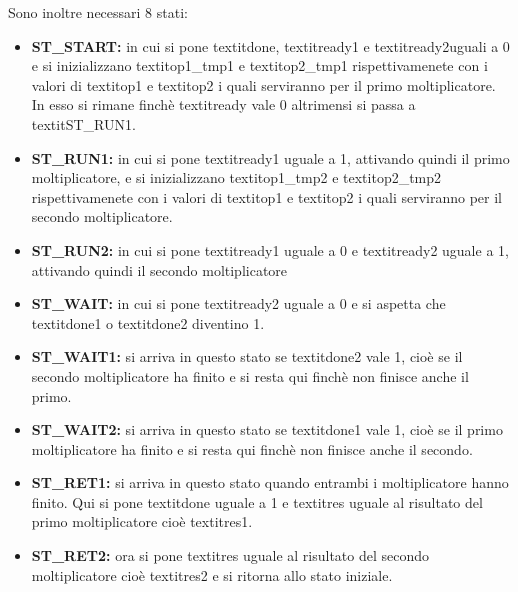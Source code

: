 \documentclass[]{IEEEtran}
\begin{document}
Sono inoltre necessari 8 stati:

\begin{itemize}
    \item \textbf{ST\_START:} in cui si pone textit{done}, textit{ready1} e textit{ready2}uguali a 0 e si inizializzano textit{op1\_tmp1} e textit{op2\_tmp1} rispettivamenete con i valori di textit{op1} e textit{op2} i quali serviranno per il primo moltiplicatore. In esso si rimane finchè textit{ready} vale 0 altrimensi si passa a textit{ST\_RUN1}.
    \item \textbf{ST\_RUN1:} in cui si pone textit{ready1} uguale a 1, attivando quindi il primo moltiplicatore, e si inizializzano textit{op1\_tmp2} e textit{op2\_tmp2} rispettivamenete con i valori di textit{op1} e textit{op2} i quali serviranno per il secondo moltiplicatore.
    \item \textbf{ST\_RUN2:} in cui si pone textit{ready1} uguale a 0 e textit{ready2} uguale a 1, attivando quindi il secondo moltiplicatore
    \item \textbf{ST\_WAIT:} in cui si pone textit{ready2} uguale a 0 e si aspetta che textit{done1} o textit{done2} diventino 1.
    \item \textbf{ST\_WAIT1:} si arriva in questo stato se textit{done2} vale 1, cioè se il secondo moltiplicatore ha finito e si resta qui finchè non finisce anche il primo.
    \item \textbf{ST\_WAIT2:} si arriva in questo stato se textit{done1} vale 1, cioè se il primo moltiplicatore ha finito e si resta qui finchè non finisce anche il secondo.
    \item \textbf{ST\_RET1:} si arriva in questo stato quando entrambi i moltiplicatore hanno finito. Qui si pone textit{done} uguale a 1 e textit{res} uguale al risultato del primo moltiplicatore cioè textit{res1}.
    \item \textbf{ST\_RET2:} ora si pone textit{res} uguale al risultato del secondo moltiplicatore cioè textit{res2} e si ritorna allo stato iniziale.
\end{itemize}
\end{document}
